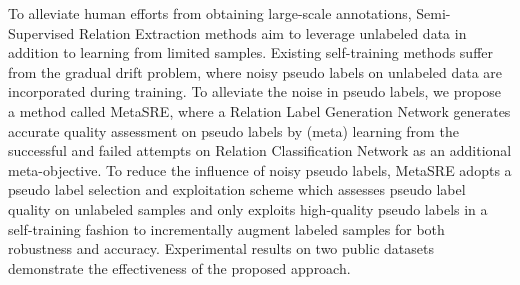 To alleviate human efforts from obtaining large-scale annotations, Semi-Supervised Relation Extraction methods aim to leverage unlabeled data in addition to learning from limited samples. Existing self-training methods suffer from the gradual drift problem, where noisy pseudo labels on unlabeled data are incorporated during training. To alleviate the noise in pseudo labels, we propose a method called MetaSRE, where a Relation Label Generation Network generates accurate quality assessment on pseudo labels by (meta) learning from the successful and failed attempts on Relation Classification Network as an additional meta-objective. To reduce the influence of noisy pseudo labels, MetaSRE adopts a pseudo label selection and exploitation scheme which assesses pseudo label quality on unlabeled samples and only exploits high-quality pseudo labels in a self-training fashion to incrementally augment labeled samples for both robustness and accuracy. Experimental results on two public datasets demonstrate the effectiveness of the proposed approach.
